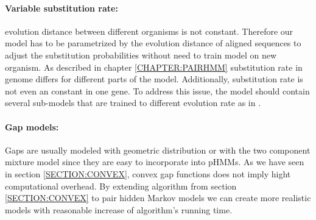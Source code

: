 
\paragraph{Variable substitution rate:} evolution distance between different
organisms is not constant.  Therefore our model has to be parametrized by the
evolution distance of aligned sequences to adjust the substitution probabilities
without need to train model on new organism. As described in chapter
\ref{CHAPTER:PAIRHMM} substitution rate in genome differs for different parts of
the model.  Additionally, substitution rate is not even an constant in one gene.
To address this issue, the model should contain several sub-models that are
trained to different evolution rate as in \cite{Hudek2010}.

\paragraph{Gap models:} Gaps are usually modeled with geometric distribution
or with the two component mixture model since they are easy to incorporate into 
pHMMs. As we have seen in section \ref{SECTION:CONVEX}, convex gap functions
does not imply hight computational overhead. By extending algorithm from section
\ref{SECTION:CONVEX} to pair hidden Markov models we can create more realistic
models with reasonable increase of algorithm's running time.


\label{LastPage}

